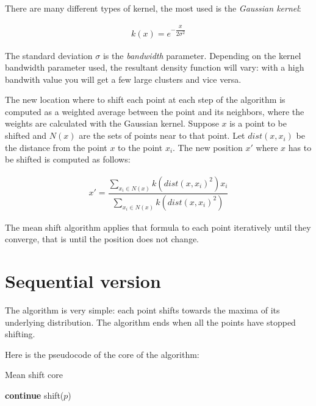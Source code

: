 \documentclass[10pt,twocolumn,letterpaper]{article}
\begin{document}
There are many different types of kernel, the most used is the \textit{Gaussian kernel}:

\begin{align}
k(x) =  e^{-\dfrac{x}{2\sigma^2}}
\end{align}

The standard deviation $\sigma$ is the \textit{bandwidth} parameter. Depending on the kernel bandwidth parameter used, the resultant density function will vary: with a high bandwith value you will get a few large clusters and vice versa.

The new location where to shift each point at each step of the algorithm is computed as a weighted average between the point and its neighbors, where the weights are calculated with the Gaussian kernel. Suppose $x$ is a point to be shifted and $N(x)$ are the sets of points near to that point. Let $dist(x, x_i)$ be the distance from the point $x$ to the point $x_i$. The new position $x'$ where $x$ has to be shifted is computed as follows:

\begin{align}
x' = \dfrac{\sum_{x_i \in N(x)} k(dist(x,x_i)^2) x_i}{\sum_{x_i \in N(x)} k(dist(x, x_i)^2)}
\end{align}

The mean shift algorithm applies that formula to each point iteratively until they converge, that is until the position does not change.

\section{Sequential version}

The algorithm is very simple: each point shifts towards the maxima of its underlying distribution. The algorithm ends when all the points have stopped shifting.

Here is the pseudocode of the core of the algorithm:

\begin{algorithm}
\label{MeanShiftAlgSeq}
\caption{Mean shift core}
\begin{algorithmic}

    				\State \textbf{continue}
    			\EndIf
    		\State shift($p$)
    		\EndFor
    \EndWhile

\end{algorithmic}
\end{algorithm}
\end{document}
